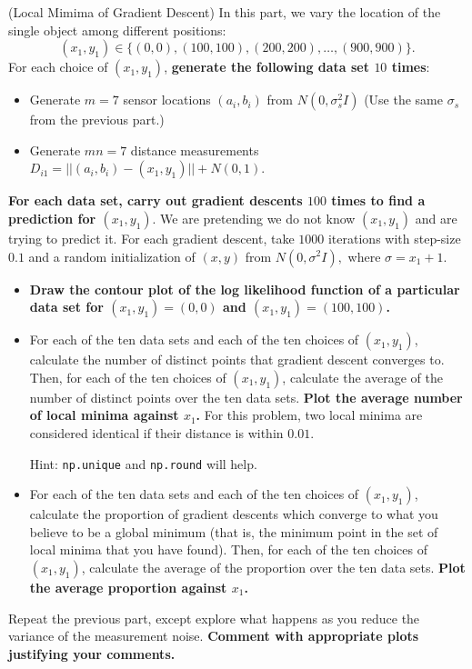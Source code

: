 \begin{Parts}
\Part (Local Mimima of Gradient Descent) In this part, we vary the
location of the single object among different positions: $$(x_1, y_1) \in \{(0,0),(100,100),(200,200),\dots,(900,900)\}.$$ For each choice of $(x_1,y_1)$, \textbf{generate the following data set $10$ times}:
  \begin{itemize}
    \item Generate $m=7$ sensor locations $(a_i, b_i)$ from $N(0,
      \sigma_s^2 I)$ (Use the same $\sigma_s$ from the previous part.) 
    \item Generate $mn=7$ distance measurements $D_{i1} = ||(a_i,b_i)-(x_1,y_1)|| + N(0, 1)$.   
  \end{itemize}
 \textbf{For each data set, carry out gradient descents $100$ times to find a prediction for $(x_1, y_1)$}. We are pretending we do not know $(x_1, y_1)$ and are trying to predict it. For each gradient descent, take $1000$ iterations with step-size $0.1$ and a random initialization of $(x,y)$ from $N(0, \sigma^2 I),$ where $\sigma=x_1+1$.
\begin{itemize}
	\item \textbf{Draw the contour plot of the log likelihood function of a particular data set for $(x_1,y_1)=(0,0)$ and $(x_1,y_1)=(100,100)$.}
	\item For each of the ten data sets and each of the ten
          choices of $(x_1, y_1)$, calculate the number of
            distinct points that gradient descent converges
            to. Then, for each of the ten choices of $(x_1,y_1)$,
          calculate the average of the number of distinct points over
          the ten data sets. \textbf{Plot the average number of local
            minima against $x_1$.} For this problem, two local minima are considered identical if their distance is within $0.01$. 

  Hint: \texttt{np.unique} and \texttt{np.round} will help.
	\item For each of the ten data sets and each of the ten
          choices of $(x_1, y_1)$, calculate the proportion of
          gradient descents which converge to what you believe to be a
          global minimum (that is, the minimum point in the set of
          local minima that you have found). Then, for each of the ten choices of $(x_1, y_1)$, calculate the average of the proportion over the ten data sets. \textbf{Plot the average proportion against $x_1$.}
\end{itemize}



\Part Repeat the previous part, except explore what happens as you
reduce the variance of the measurement noise. {\bf Comment with
  appropriate plots justifying your comments.}


\end{Parts}

